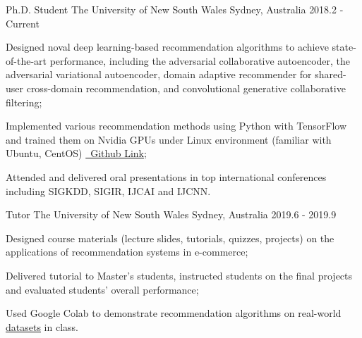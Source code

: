 

\begin{cventries}

  \cventry
  {Ph.D. Student} %
  {The University of New South Wales} %
  {Sydney, Australia} %
  {2018.2 - Current} %
  {
    \begin{cvitems} %
      \item Designed noval deep learning-based recommendation algorithms to achieve state-of-the-art performance, including the adversarial collaborative autoencoder, the adversarial variational autoencoder, domain adaptive recommender for shared-user cross-domain recommendation, and convolutional generative collaborative filtering;
      \item Implemented various recommendation methods using Python with TensorFlow and trained them on Nvidia GPUs under Linux environment (familiar with Ubuntu, CentOS) \href{https://github.com/bennetyf/RecSys}{\faGithub~Github Link};
      \item Attended and delivered oral presentations in top international conferences including SIGKDD, SIGIR, IJCAI and IJCNN.
    \end{cvitems}
  }

  \cventry
    {Tutor} %
    {The University of New South Wales} %
    {Sydney, Australia} %
    {2019.6 - 2019.9} %
    {
      \begin{cvitems} %
        \item Designed course materials (lecture slides, tutorials, quizzes, projects) on the applications of recommendation systems in e-commerce;
        \item Delivered tutorial to Master's students, instructed students on the final projects and evaluated students' overall performance;
        \item Used Google Colab to demonstrate recommendation algorithms on real-world \href{http://cseweb.ucsd.edu/~jmcauley/datasets.html}{\underline{datasets}} in class.
      \end{cvitems}
  }


\end{cventries}
